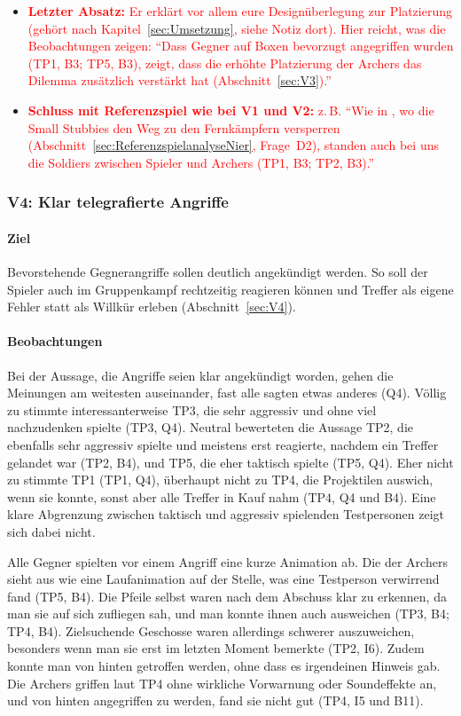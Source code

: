 \documentclass[../Main.tex]{subfiles}
\begin{document}
\begin{itemize}[leftmargin=1.5cm]
    \item \textcolor{red}{\textbf{Letzter Absatz:} Er erklärt vor allem eure Designüberlegung zur Platzierung (gehört nach Kapitel~\ref{sec:Umsetzung}, siehe Notiz dort). Hier reicht, was die Beobachtungen zeigen: \enquote{Dass Gegner auf Boxen bevorzugt angegriffen wurden (TP1, B3; TP5, B3), zeigt, dass die erhöhte Platzierung der Archers das Dilemma zusätzlich verstärkt hat (Abschnitt~\ref{sec:V3}).}}
    \item \textcolor{red}{\textbf{Schluss mit Referenzspiel wie bei V1 und V2:} z.\,B. \enquote{Wie in , wo die Small Stubbies den Weg zu den Fernkämpfern versperren (Abschnitt~\ref{sec:ReferenzspielanalyseNier}, Frage~D2), standen auch bei uns die Soldiers zwischen Spieler und Archers (TP1, B3; TP2, B3).}}
\end{itemize}

\subsubsection{V4: Klar telegrafierte Angriffe}

\paragraph{Ziel}
Bevorstehende Gegnerangriffe sollen deutlich angekündigt werden. So soll der Spieler auch im Gruppenkampf rechtzeitig reagieren können und Treffer als eigene Fehler statt als Willkür erleben (Abschnitt~\ref{sec:V4}).

\paragraph{Beobachtungen}
Bei der Aussage, die Angriffe seien klar angekündigt worden, gehen die Meinungen am weitesten auseinander, fast alle sagten etwas anderes (Q4). Völlig zu stimmte interessanterweise TP3, die sehr aggressiv und ohne viel nachzudenken spielte (TP3, Q4). Neutral bewerteten die Aussage TP2, die ebenfalls sehr aggressiv spielte und meistens erst reagierte, nachdem ein Treffer gelandet war (TP2, B4), und TP5, die eher taktisch spielte (TP5, Q4). Eher nicht zu stimmte TP1 (TP1, Q4), überhaupt nicht zu TP4, die Projektilen auswich, wenn sie konnte, sonst aber alle Treffer in Kauf nahm (TP4, Q4 und B4). Eine klare Abgrenzung zwischen taktisch und aggressiv spielenden Testpersonen zeigt sich dabei nicht.

Alle Gegner spielten vor einem Angriff eine kurze Animation ab. Die der Archers sieht aus wie eine Laufanimation auf der Stelle, was eine Testperson verwirrend fand (TP5, B4). Die Pfeile selbst waren nach dem Abschuss klar zu erkennen, da man sie auf sich zufliegen sah, und man konnte ihnen auch ausweichen (TP3, B4; TP4, B4). Zielsuchende Geschosse waren allerdings schwerer auszuweichen, besonders wenn man sie erst im letzten Moment bemerkte (TP2, I6). Zudem konnte man von hinten getroffen werden, ohne dass es irgendeinen Hinweis gab. Die Archers griffen laut TP4 ohne wirkliche Vorwarnung oder Soundeffekte an, und von hinten angegriffen zu werden, fand sie nicht gut (TP4, I5 und B11).
\end{document}
